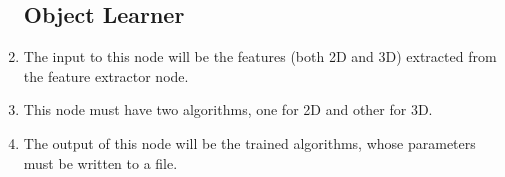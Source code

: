 \begin{enumerate}[label=\textbf{FR\threedigits*}, leftmargin=2cm]


\subsection{Object Learner}
	\item The input to this node will be the features (both 2D and 3D) extracted from the feature extractor node. 
	\item This node must have two algorithms, one for 2D and other for 3D. 
	\item The output of this node will be the trained algorithms, whose parameters must be written to a file. 


\end{enumerate}
